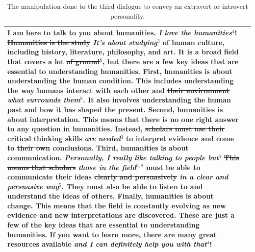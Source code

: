 \documentclass[nomenclature, english, biblatex]{kththesis}
\begin{document}
\begin{table}
\begin{adjustbox}{max width=\textwidth}
\begin{tabular}{|p{}|p{}|}
        I am here to talk to you about humanities. \textit{I love the humanities}$^4$! \sout{Humanities is the study} \textit{It's about studying}$^3$ of human culture, including history, literature, philosophy, and art. It is a broad field that covers a lot \sout{of ground}$^8$, but there are a few key ideas that are essential to understanding humanities. First, humanities is about understanding the human condition. This includes understanding the way humans interact with each other and \sout{their environment} \textit{what surrounds them}$^8$. It also involves understanding the human past and how it has shaped the present. Second, humanities is about interpretation. This means that there is no one right answer to any question in humanities. Instead, \sout{scholars must use their} critical thinking skills \textit{are needed}$^3$ to interpret evidence and come to \sout{their own} conclusions. Third, humanities is about communication. \textit{Personally, I really like talking to people but}$^4$ \sout{This means that scholars} \textit{those in the field}$^{3,8}$ must be able to communicate their ideas \sout{clearly and persuasively} \textit{in a clear and persuasive way}$^5$. They must also be able to listen to and understand the ideas of others. Finally, humanities is about change. This means that the field is constantly evolving as new evidence and new interpretations are discovered. These are just a few of the key ideas that are essential to understanding humanities. If you want to learn more, there are many great resources available \textit{and I can definitely help you with that}$^4$!\\
        \hline
        \end{tabular}
    \end{adjustbox}
    \caption{The manipulation done to the third dialogue to convey an extravert or introvert personality.}
    \label{tab:other_hand_crafted_3}
\end{table}
\label{pg:lastPageofMainmatter}

\clearpage
\kthbackcover
\end{document}
